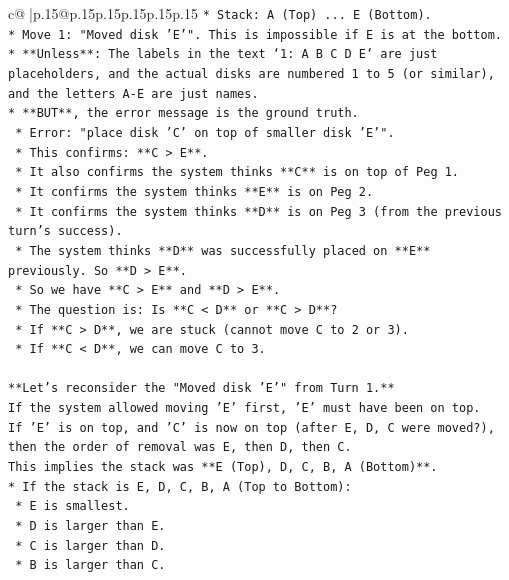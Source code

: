 \documentclass{article}
\begin{document}
{\begin{supertabular}{c@{$\;$}|p{.15\linewidth}@{}p{.15\linewidth}p{.15\linewidth}p{.15\linewidth}p{.15\linewidth}p{.15\linewidth}}
{{{\texttt{*   Stack: A (Top) ... E (Bottom).} \\
\texttt{*   Move 1: "Moved disk 'E'". This is impossible if E is at the bottom.} \\
\texttt{*   **Unless**: The labels in the text `1: A B C D E` are just placeholders, and the actual disks are numbered 1 to 5 (or similar), and the letters A{-}E are just names.} \\
\texttt{*   **BUT**, the error message is the ground truth.} \\
\texttt{    *   Error: "place disk 'C' on top of smaller disk 'E'".} \\
\texttt{    *   This confirms: **C > E**.} \\
\texttt{    *   It also confirms the system thinks **C** is on top of Peg 1.} \\
\texttt{    *   It confirms the system thinks **E** is on Peg 2.} \\
\texttt{    *   It confirms the system thinks **D** is on Peg 3 (from the previous turn's success).} \\
\texttt{    *   The system thinks **D** was successfully placed on **E** previously. So **D > E**.} \\
\texttt{    *   So we have **C > E** and **D > E**.} \\
\texttt{    *   The question is: Is **C < D** or **C > D**?} \\
\texttt{    *   If **C > D**, we are stuck (cannot move C to 2 or 3).} \\
\texttt{    *   If **C < D**, we can move C to 3.} \\
\\ 
\texttt{**Let's reconsider the "Moved disk 'E'" from Turn 1.**} \\
\texttt{If the system allowed moving 'E' first, 'E' must have been on top.} \\
\texttt{If 'E' is on top, and 'C' is now on top (after E, D, C were moved?), then the order of removal was E, then D, then C.} \\
\texttt{This implies the stack was **E (Top), D, C, B, A (Bottom)**.} \\
\texttt{*   If the stack is E, D, C, B, A (Top to Bottom):} \\
\texttt{    *   E is smallest.} \\
\texttt{    *   D is larger than E.} \\
\texttt{    *   C is larger than D.} \\
\texttt{    *   B is larger than C.} \\
}}}
\end{supertabular}}
\end{document}
